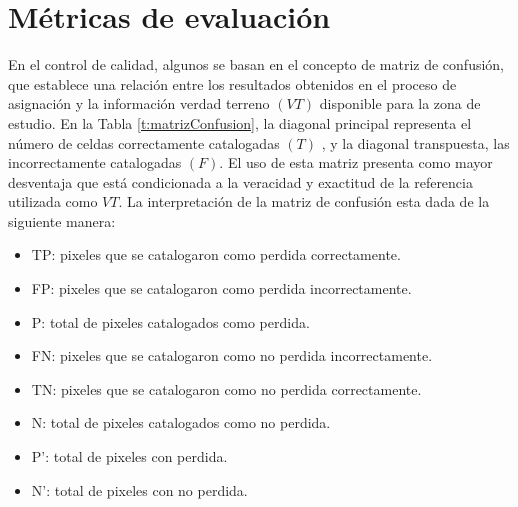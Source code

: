 \section{Métricas de evaluación}
En el control de calidad, algunos se basan en el concepto de matriz de confusi\'on, que establece una relaci\'on entre los resultados obtenidos en el proceso de asignaci\'on y la informaci\'on verdad terreno $ (VT) $ disponible para la zona de estudio. En la Tabla \ref{t:matrizConfusion}, la diagonal principal representa el n\'umero de celdas correctamente catalogadas $ (T) $ , y la diagonal transpuesta, las incorrectamente catalogadas $ (F) $. El uso de esta matriz presenta como mayor desventaja que est\'a condicionada a la veracidad y exactitud de la referencia utilizada como $ VT $. La interpretaci\'on de la matriz de confusi\'on esta dada de la siguiente manera:
\begin{itemize}
	\item TP: pixeles que se catalogaron como perdida correctamente.
	\item FP: pixeles que se catalogaron como perdida incorrectamente.
	\item P: total de pixeles catalogados como perdida.
	\item FN: pixeles que se catalogaron como no perdida incorrectamente.
	\item TN: pixeles que se catalogaron como no perdida correctamente.
	\item N: total de pixeles catalogados como no perdida.
	\item P': total de pixeles con perdida.
	\item N': total de pixeles con no perdida.
\end{itemize}

